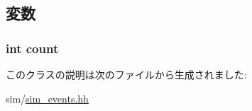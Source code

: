 \subsection{変数}
\hypertarget{classCountedDrainEvent_ad43c3812e6d13e0518d9f8b8f463ffcf}{
\subsubsection[{count}]{\setlength{\rightskip}{0pt plus 5cm}int {\bf count}}}
\label{classCountedDrainEvent_ad43c3812e6d13e0518d9f8b8f463ffcf}


このクラスの説明は次のファイルから生成されました:\begin{DoxyCompactItemize}
\item 
sim/\hyperlink{sim__events_8hh}{sim\_\-events.hh}\end{DoxyCompactItemize}
